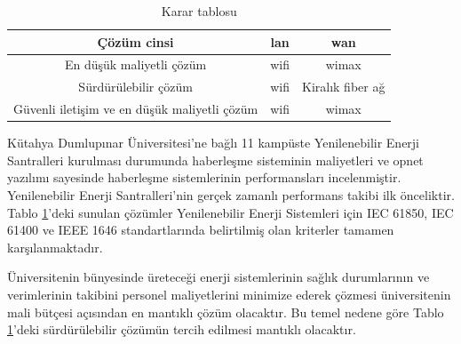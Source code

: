 \begin{table}[htbp]
\centering
\caption{Karar tablosu}
\label{tab:tablo5-1}
\begin{tabular}{|c|c|c|}
\hline
Çözüm cinsi                               & \gls{lan} & \gls{wan}        \\ \hline
En düşük maliyetli çözüm                     & \gls{wifi}           & \gls{wimax}                 \\ \hline
Sürdürülebilir çözüm                      & \gls{wifi}           & Kiralık fiber ağ \\ \hline
Güvenli iletişim ve en düşük maliyetli çözüm & \gls{wifi}           & \gls{wimax}                 \\ \hline
\end{tabular}

\end{table}


Kütahya Dumlupınar Üniversitesi'ne bağlı 11 kampüste Yenilenebilir Enerji Santralleri kurulması durumunda haberleşme sisteminin maliyetleri ve \gls{opnet} yazılımı sayesinde haberleşme sistemlerinin performansları incelenmiştir. Yenilenebilir Enerji Santralleri'nin gerçek zamanlı performans takibi ilk önceliktir. Tablo \ref{tab:tablo5-1}'deki sunulan çözümler Yenilenebilir Enerji Sistemleri için IEC 61850, IEC 61400 ve IEEE 1646 standartlarında belirtilmiş olan kriterler tamamen karşılanmaktadır.


Üniversitenin bünyesinde üreteceği enerji sistemlerinin sağlık durumlarının ve verimlerinin takibini personel maliyetlerini minimize ederek çözmesi üniversitenin mali bütçesi açısından en mantıklı çözüm olacaktır. Bu temel nedene göre Tablo \ref{tab:tablo5-1}'deki sürdürülebilir çözümün tercih edilmesi mantıklı olacaktır.


